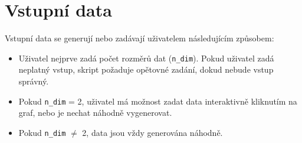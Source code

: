 \section{Vstupní data}
Vstupní data se generují nebo zadávají uživatelem následujícím způsobem:

\begin{itemize}
    \item Uživatel nejprve zadá počet rozměrů dat (\texttt{n\_dim}). Pokud uživatel zadá neplatný vstup, skript požaduje opětovné zadání, dokud nebude vstup správný.
    \item Pokud \texttt{n\_dim} = 2, uživatel má možnost zadat data interaktivně kliknutím na graf, nebo je nechat náhodně vygenerovat.
    \item Pokud \texttt{n\_dim} \(\neq\) 2, data jsou vždy generována náhodně.
\end{itemize}

